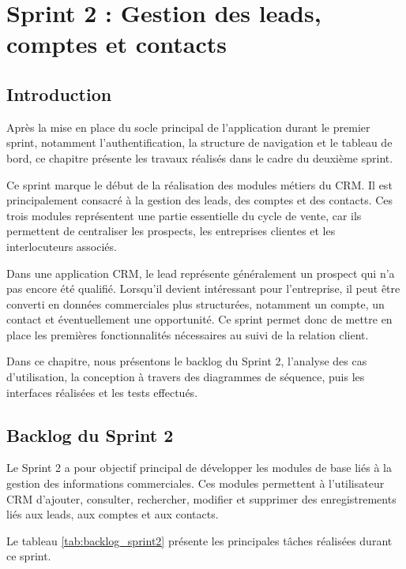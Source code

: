 \documentclass[12pt,a4paper,twoside,openany]{book}
\begin{document}
\chapter{Sprint 2 : Gestion des leads, comptes et contacts}

\section*{Introduction}

Après la mise en place du socle principal de l’application durant le premier sprint, notamment l’authentification, la structure de navigation et le tableau de bord, ce chapitre présente les travaux réalisés dans le cadre du deuxième sprint.

Ce sprint marque le début de la réalisation des modules métiers du CRM. Il est principalement consacré à la gestion des leads, des comptes et des contacts. Ces trois modules représentent une partie essentielle du cycle de vente, car ils permettent de centraliser les prospects, les entreprises clientes et les interlocuteurs associés.

Dans une application CRM, le lead représente généralement un prospect qui n’a pas encore été qualifié. Lorsqu’il devient intéressant pour l’entreprise, il peut être converti en données commerciales plus structurées, notamment un compte, un contact et éventuellement une opportunité. Ce sprint permet donc de mettre en place les premières fonctionnalités nécessaires au suivi de la relation client.

Dans ce chapitre, nous présentons le backlog du Sprint 2, l’analyse des cas d’utilisation, la conception à travers des diagrammes de séquence, puis les interfaces réalisées et les tests effectués.

\section{Backlog du Sprint 2}

Le Sprint 2 a pour objectif principal de développer les modules de base liés à la gestion des informations commerciales. Ces modules permettent à l’utilisateur CRM d’ajouter, consulter, rechercher, modifier et supprimer des enregistrements liés aux leads, aux comptes et aux contacts.

Le tableau \ref{tab:backlog_sprint2} présente les principales tâches réalisées durant ce sprint.
\end{document}

